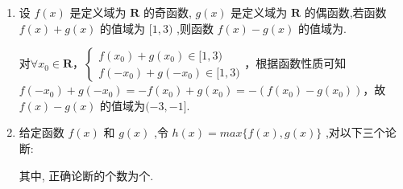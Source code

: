 \begin{enumerate}
    \item 设 $f\left( x\right)$ 是定义域为 $\mathbf{R}$ 的奇函数, $g\left( x\right)$ 是定义域为 $\mathbf{R}$ 的偶函数,若函数 $f\left( x\right)  + g\left( x\right)$ 的值域为 $\lbrack 1,3)$ ,则函数 $f\left( x\right)  - g\left( x\right)$ 的值域为\blkda{$(-3, -1]$}.
    \begin{jieda}
        对$\forall x_0 \in \mathbf{R}$，$\left\{\begin{array}{l}
             f(x_0)+g(x_0) \in [1,3)  \\
             f(-x_0)+g(-x_0) \in [1,3)
        \end{array}\right.$，根据函数性质可知$f(-x_0)+g(-x_0) = -f(x_0)+g(x_0) = -(f(x_0)-g(x_0))$，故$f\left( x\right)  - g\left( x\right)$ 的值域为$(-3, -1]$.
    \end{jieda}
    
    \item 给定函数 $f\left( x\right)$ 和 $g\left( x\right)$ ,令 $h\left( x\right)  = max \{ f\left( x\right) ,g\left( x\right) \}$ ,对以下三个论断:
    其中, 正确论断的个数为个.
    \begin{jieda}
\end{jieda}
\end{enumerate}
